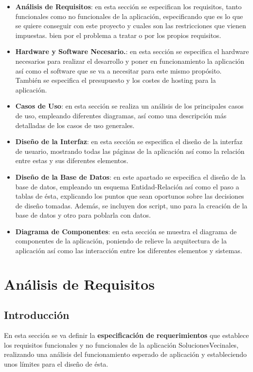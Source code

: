 \begin{itemize}
	\item \textbf{Análisis de Requisitos}: en esta sección se especifican los requisitos, tanto funcionales como no funcionales de la aplicación, especificando que es lo que se quiere conseguir con este proyecto y cuales son las restricciones que vienen impuestas. bien por el problema a tratar o por los propios requisitos.
	
	\item \textbf{Hardware y Software Necesario.}: en esta sección se especifica el hardware necesarios para realizar el desarrollo y poner en funcionamiento la aplicación así como el software que se va a necesitar para este mismo propósito. También se especifica el presupuesto y los costes de hosting para la aplicación.
	
	\item \textbf{Casos de Uso}: en esta sección se realiza un análisis de los principales casos de uso, empleando diferentes diagramas, así como una descripción más detalladas de los casos de uso generales.
	
	\item \textbf{Diseño de la Interfaz}: en esta sección se especifica el diseño de la interfaz de usuario, mostrando todas las páginas de la aplicación así como la relación entre estas y sus diferentes elementos.
	
	\item \textbf{Diseño de la Base de Datos}: en este apartado se especifica el diseño de la base de datos, empleando un esquema Entidad-Relación así como el paso a tablas de ésta, explicando los puntos que sean oportunos sobre las decisiones de diseño tomadas. Además, se incluyen dos script, uno para la creación de la base de datos y otro para poblarla con datos.
	
	\item \textbf{Diagrama de Componentes}: en esta sección se muestra el diagrama de componentes de la aplicación, poniendo de relieve la arquitectura de la aplicación así como las interacción entre los diferentes elementos y sistemas.
\end{itemize}



\section{Análisis de Requisitos}

\subsection{Introducción}
En esta sección se va definir la \textbf{especificación de requerimientos} que establece los requisitos funcionales y no funcionales de la aplicación SolucionesVecinales, realizando una análisis del funcionamiento esperado de aplicación y estableciendo unos límites para el diseño de ésta.

